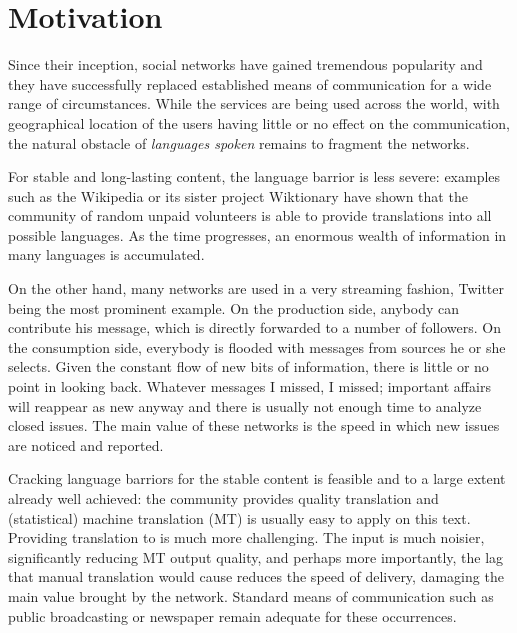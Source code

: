 %

\section{Motivation}
\label{motiv}

Since their inception, social networks have gained tremendous popularity and
they have successfully replaced established means of communication for a wide
range of circumstances. While the services are being used across the world, with
geographical location of the users having little or no effect on the
communication, the
natural obstacle of \emph{languages spoken} remains to fragment the networks.

For stable and long-lasting content, the language barrior is less severe:
examples such as the Wikipedia or its sister project Wiktionary have shown that
the community of random unpaid volunteers is able to provide translations into
all possible languages. As the time progresses, an enormous wealth of
information in many languages is accumulated.

On the other hand, many networks are used in a very streaming fashion, Twitter
being the most prominent example. On the production side, anybody can contribute
his message, which is
directly forwarded to a number of followers. On the consumption side, everybody
is flooded with messages from sources he or she selects. Given the constant flow
of new bits of information, there is little or no point in looking back.
Whatever messages I missed, I missed; important affairs will reappear as new
anyway and there is usually not enough time to analyze closed issues. The main
value of these networks is the speed in which new issues are noticed and
reported.

Cracking language barriors for the stable content is feasible and to a large
extent already well achieved: the community provides quality translation and
(statistical) machine translation (MT) is usually easy to apply on this
 text.
Providing translation to  is much more challenging.
The input is much noisier, significantly reducing MT output quality, and perhaps
more importantly, the lag that manual translation would cause reduces the speed
of delivery, damaging the main value brought by the network. Standard means of
communication such as public broadcasting or newspaper remain adequate for these
occurrences.

